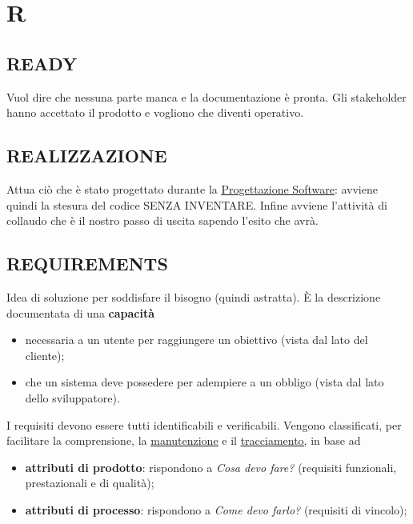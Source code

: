 \newpage
	\section{R} \label{sec:R}
	
		\subsection{READY}		\label{ready}
		Vuol dire che nessuna parte manca e la documentazione è pronta. Gli stakeholder hanno accettato il prodotto e vogliono che diventi operativo.
	
		\subsection{REALIZZAZIONE} 	\label{realizzazione}
		Attua ciò che è stato progettato durante la \underline{\hyperref[progettazione]{Progettazione Software}}: avviene quindi la stesura del codice SENZA INVENTARE. Infine avviene l'attività di collaudo che è il nostro passo di uscita sapendo l'esito che avrà.
		
		\subsection{REQUIREMENTS}  \label{requirements}
		Idea di soluzione per soddisfare il bisogno (quindi astratta).
		È la descrizione documentata di una \textbf{capacità}
		\begin{itemize}
			\item necessaria a un utente per raggiungere un obiettivo (vista dal lato del cliente);
			\item che un sistema deve possedere per adempiere a un obbligo (vista dal lato dello sviluppatore). 
		\end{itemize}
	
	    I requisiti devono essere tutti identificabili e verificabili. Vengono classificati, per facilitare la comprensione, la \underline{\hyperref[manutenzione]{manutenzione}} e il \underline{\hyperref[tracciamento]{tracciamento}}, in base ad
	    	\begin{itemize}
	    		\item \textbf{attributi di prodotto}: rispondono a \textit{Cosa devo fare?} (requisiti funzionali, prestazionali e di qualità);
	    		\item \textbf{attributi di processo}: rispondono a \textit{Come devo farlo?} (requisiti di vincolo);
	    	\end{itemize}
	    
